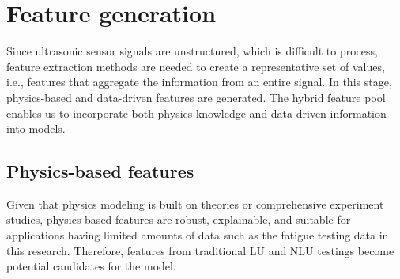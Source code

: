 \section{Feature generation}
Since ultrasonic sensor signals are unstructured, which is difficult to process, feature extraction methods are needed to create a representative set of values, i.e., features that aggregate the information from an entire signal. In this stage, physics-based and data-driven features are generated. The hybrid feature pool enables us to incorporate both physics knowledge and data-driven information into models.

\subsection{Physics-based features}
Given that physics modeling is built on theories or comprehensive experiment studies, physics-based features are robust, explainable, and suitable for applications having limited amounts of data such as the fatigue testing data in this research. Therefore, features from traditional LU and NLU testings become potential candidates for the model.
